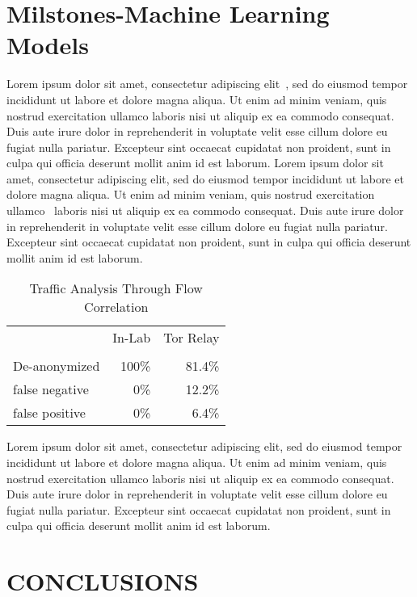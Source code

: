 \documentclass[letterpaper, 10 pt, conference]{ieeeconf}  %
\begin{document}
\section{Milstones-Machine Learning Models}

Lorem ipsum dolor sit amet, consectetur adipiscing elit~\cite{Cite14}, sed do eiusmod tempor incididunt ut labore et dolore magna aliqua. Ut enim ad minim veniam, quis nostrud exercitation ullamco laboris nisi ut aliquip ex ea commodo consequat. Duis aute irure dolor in reprehenderit in voluptate velit esse cillum dolore eu fugiat nulla pariatur. Excepteur sint occaecat cupidatat non proident, sunt in culpa qui officia deserunt mollit anim id est laborum. Lorem ipsum dolor sit amet, consectetur adipiscing elit, sed do eiusmod tempor incididunt ut labore et dolore magna aliqua. Ut enim ad minim veniam, quis nostrud exercitation ullamco~\cite{Cite15} laboris nisi ut aliquip ex ea commodo consequat. Duis aute irure dolor in reprehenderit in voluptate velit esse cillum dolore eu fugiat nulla pariatur. Excepteur sint occaecat cupidatat non proident, sunt in culpa qui officia deserunt mollit anim id est laborum.

\begin{center}
\begin{table}[ht]
	\caption{Traffic Analysis Through Flow Correlation}
	\centering
	\begin{tabular}{l r r}
		\hline\hline
		\ \ & In-Lab & Tor Relay \\\\ [0.5ex] 
		\hline
		De-anonymized&100\%&81.4\% \\
		false negative&0\%&12.2\% \\
		false positive&0\%&6.4\%\\ [1ex]
		\hline
	\end{tabular}
	\label{table:nonlin}
\end{table}
\end{center} 

Lorem ipsum dolor sit amet, consectetur adipiscing elit, sed do eiusmod tempor incididunt ut labore et dolore magna aliqua. Ut enim ad minim veniam, quis nostrud exercitation ullamco laboris nisi ut aliquip ex ea commodo consequat. Duis aute irure dolor in reprehenderit in voluptate velit esse cillum dolore eu fugiat nulla pariatur. Excepteur sint occaecat cupidatat non proident, sunt in culpa qui officia deserunt mollit anim id est laborum.

\section{CONCLUSIONS}
\end{document}
